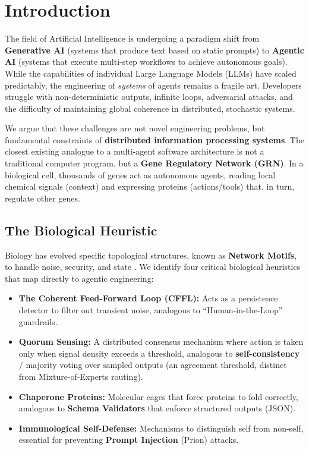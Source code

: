 \documentclass[11pt, a4paper]{article}
\begin{document}
\section{Introduction}

The field of Artificial Intelligence is undergoing a paradigm shift from \textbf{Generative AI} (systems that produce text based on static prompts) to \textbf{Agentic AI} (systems that execute multi-step workflows to achieve autonomous goals). While the capabilities of individual Large Language Models (LLMs) have scaled predictably, the engineering of \textit{systems} of agents remains a fragile art. Developers struggle with non-deterministic outputs, infinite loops, adversarial attacks, and the difficulty of maintaining global coherence in distributed, stochastic systems.

We argue that these challenges are not novel engineering problems, but fundamental constraints of \textbf{distributed information processing systems}. The closest existing analogue to a multi-agent software architecture is not a traditional computer program, but a \textbf{Gene Regulatory Network (GRN)}. In a biological cell, thousands of genes act as autonomous agents, reading local chemical signals (context) and expressing proteins (actions/tools) that, in turn, regulate other genes.

\subsection{The Biological Heuristic}
Biology has evolved specific topological structures, known as \textbf{Network Motifs}, to handle noise, security, and state \cite{milo2002network}. We identify four critical biological heuristics that map directly to agentic engineering:
\begin{itemize}
    \item \textbf{The Coherent Feed-Forward Loop (CFFL):} Acts as a persistence detector to filter out transient noise, analogous to ``Human-in-the-Loop'' guardrails.
    \item \textbf{Quorum Sensing:} A distributed consensus mechanism where action is taken only when signal density exceeds a threshold, analogous to \textbf{self-consistency} / majority voting over sampled outputs (an agreement threshold, distinct from Mixture-of-Experts routing).
    \item \textbf{Chaperone Proteins:} Molecular cages that force proteins to fold correctly, analogous to \textbf{Schema Validators} that enforce structured outputs (JSON).
    \item \textbf{Immunological Self-Defense:} Mechanisms to distinguish self from non-self, essential for preventing \textbf{Prompt Injection} (Prion) attacks.
\end{itemize}
\end{document}
